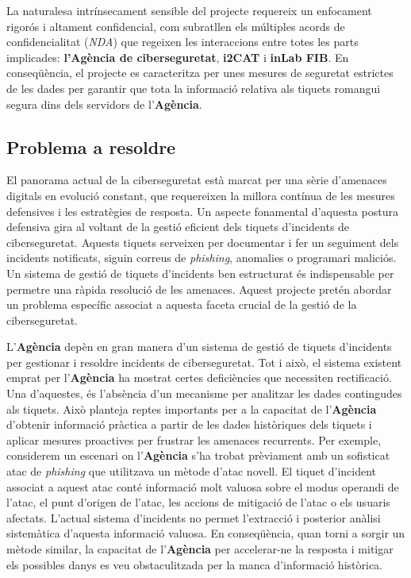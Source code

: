 La naturalesa intrínsecament sensible del projecte requereix un enfocament rigorós i altament confidencial, com subratllen els múltiples acords de confidencialitat (\textit{NDA}) que regeixen les interaccions entre totes les parts implicades: \textbf{l'Agència de ciberseguretat}, \textbf{i2CAT} i \textbf{inLab FIB}. En conseqüència, el projecte es caracteritza per unes mesures de seguretat estrictes de les dades per garantir que tota la informació relativa als tiquets romangui segura dins dels servidors de l'\textbf{Agència}.


\subsection{Problema a resoldre} \label{ssec:problema-resoldre}
El panorama actual de la ciberseguretat està marcat per una sèrie d'amenaces digitals en evolució constant, que requereixen la millora contínua de les mesures defensives i les estratègies de resposta. Un aspecte fonamental d'aquesta postura defensiva gira al voltant de la gestió eficient dels tiquets d'incidents de ciberseguretat. Aquests tiquets serveixen per documentar i fer un seguiment dels incidents notificats, siguin correus de \textit{phishing}, anomalies o programari maliciós. Un sistema de gestió de tiquets d'incidents ben estructurat és indispensable per permetre una ràpida resolució de les amenaces. Aquest projecte pretén abordar un problema específic associat a aquesta faceta crucial de la gestió de la ciberseguretat.

L'\textbf{Agència} depèn en gran manera d'un sistema de gestió de tiquets d'incidents per gestionar i resoldre incidents de ciberseguretat. Tot i això, el sistema existent emprat per l'\textbf{Agència} ha mostrat certes deficiències que necessiten rectificació. Una d'aquestes, és l'absència d'un mecanisme per analitzar les dades contingudes als tiquets. Això planteja reptes importants per a la capacitat de l'\textbf{Agència} d'obtenir informació pràctica a partir de les dades històriques dels tiquets i aplicar mesures proactives per frustrar les amenaces recurrents.
Per exemple, considerem un escenari on l'\textbf{Agència} s'ha trobat prèviament amb un sofisticat atac de \textit{phishing} que utilitzava un mètode d'atac novell. El tiquet d'incident associat a aquest atac conté informació molt valuosa sobre el modus operandi de l'atac, el punt d'origen de l'atac, les accions de mitigació de l'atac o els usuaris afectats. L'actual sistema d'incidents no permet l'extracció i posterior anàlisi sistemàtica d'aquesta informació valuosa. En conseqüència, quan torni a sorgir un mètode similar, la capacitat de l'\textbf{Agència} per accelerar-ne la resposta i mitigar els possibles danys es veu obstaculitzada per la manca d'informació històrica.

